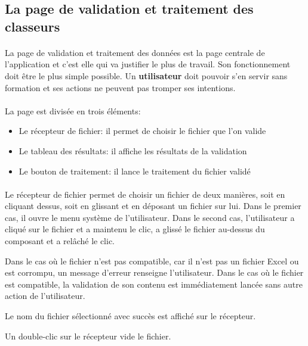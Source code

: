 \subsection{La page de validation et traitement des classeurs}
\label{subsec:spreadsheet-page}

\paragraph{}
La page de validation et traitement des données est la page centrale de l'application et c'est elle qui va justifier le plus de travail.
Son fonctionnement doit être le plus simple possible.
Un \textbf{utilisateur} doit pouvoir s'en servir sans formation et ses actions ne peuvent pas tromper ses intentions.

\paragraph{}
La page est divisée en trois éléments:
\begin{itemize}
    \item Le récepteur de fichier: il permet de choisir le fichier que l'on valide
    \item Le tableau des résultats: il affiche les résultats de la validation
    \item Le bouton de traitement: il lance le traitement du fichier validé
\end{itemize}

\paragraph{}
Le récepteur de fichier permet de choisir un fichier de deux manières, soit en cliquant dessus, soit en glissant et en déposant un fichier sur lui.
Dans le premier cas, il ouvre le menu système\fnmark{} de l'utilisateur. Dans le second cas, l'utilisateur a cliqué sur le fichier et a maintenu le clic, a glissé le fichier au-dessus du composant et a relâché le clic.

Dans le cas où le fichier n'est pas compatible, car il n'est pas un fichier Excel ou est corrompu, un message d'erreur renseigne l'utilisateur.
Dans le cas où le fichier est compatible, la validation de son contenu est immédiatement lancée sans autre action de l'utilisateur.

Le nom du fichier sélectionné avec succès est affiché sur le récepteur.

Un double-clic sur le récepteur vide le fichier.

